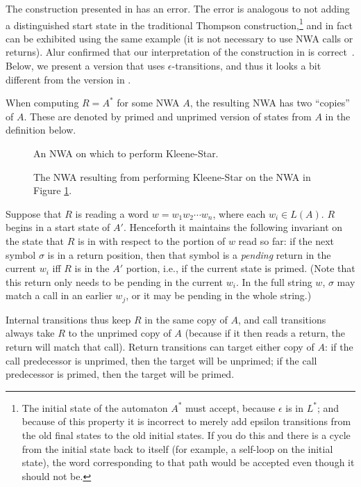 The construction presented in \cite{JACM:AM2009} has an error. The error is
analogous to not adding a distinguished start state in the traditional
Thompson construction,\footnote{The initial state of the automaton $A^*$
  must accept, because $\epsilon$ is in $L^*$; and because of this property it is
  incorrect to merely add epsilon transitions from the old final states to
  the old initial states. If you do this and there is a cycle from the
  initial state back to itself (for example, a self-loop on the initial
  state), the word corresponding to that path would be accepted even though
  it should not be.} and in
fact can be exhibited using the same example (it is not necessary to use NWA
calls or returns). Alur confirmed that our interpretation of the construction
in \cite{JACM:AM2009} is
correct~\cite{AlurNwaStarBroken}. Below, we present
a version that uses $\epsilon$-transitions, and thus it looks a bit
different from the version in \cite{JACM:AM2009}.

When computing $R = A^*$ for some
NWA $A$, the resulting NWA has two ``copies'' of $A$. These are denoted by
primed and unprimed version of states from $A$ in the definition below. 

\begin{figure}[p]
  \centering
  \caption{An NWA on which to perform Kleene-Star.}
  \label{Fi:Star1}
\end{figure}

\begin{figure}[p]
  \centering
  \caption{The NWA resulting from performing Kleene-Star on the NWA in Figure \ref{Fi:Star1}.}
  \label{Fi:Star2}
\end{figure}
\antistupidfloats


Suppose that $R$ is reading a word $w=w_1w_2\cdots w_n$, where each $w_i \in
L(A)$. $R$ begins in a start state of $A'$. Henceforth it maintains the
following invariant on the state that $R$ is in with respect to the portion
of $w$ read so far: if the next symbol $\sigma$ is in a return position, then
that
symbol is a \emph{pending} return in the current $w_i$ iff $R$ is in the $A'$
portion, i.e., if the current state is primed. (Note that this return only
needs to be
pending in the current $w_i$. In the full string $w$, $\sigma$ may match a
call in an earlier $w_j$, or it may be pending in the whole string.)

Internal transitions thus keep $R$ in the same copy of $A$, and call
transitions always take $R$ to the unprimed copy of $A$ (because if it then
reads a return, the return will match that call). Return transitions can
target either copy of $A$: if the call predecessor is unprimed, then the
target will be unprimed; if the call predecessor is primed, then the target
will be primed.

